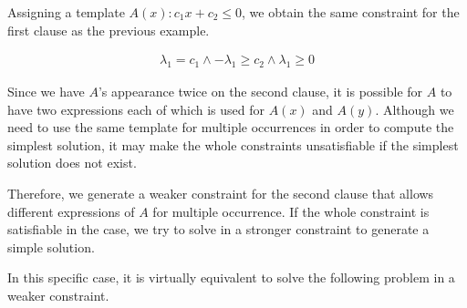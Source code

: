 Assigning a template $A(x) : c_1 x + c_2 \leq 0$, we obtain the same
constraint for the first clause as the previous example.

\begin{align} \label{eq:constr1}
\lambda_1 = c_1 \wedge - \lambda_1 \geq c_2 \wedge \lambda_1 \geq 0
\end{align}

Since we have $A$'s appearance twice on the second clause, it is
possible for $A$ to have two expressions each of which is used for
$A(x)$ and $A(y)$.  Although we need to use the same template for
multiple occurrences in order to compute the simplest solution, it may
make the whole constraints unsatisfiable if the simplest solution does
not exist.

Therefore, we generate a weaker constraint for the second clause that
allows different expressions of $A$ for multiple occurrence.  If the
whole constraint is satisfiable in the case, we try to solve in a
stronger constraint to generate a simple solution.

In this specific case, it is virtually equivalent to solve the
following problem in a weaker constraint.

